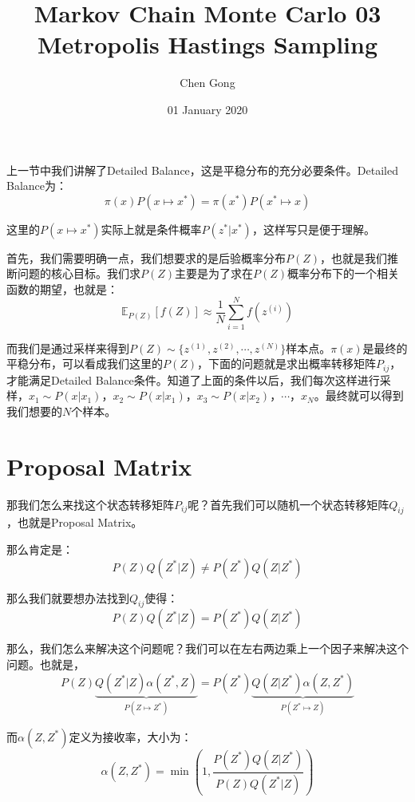 \documentclass[a4paper]{article}
\title{Markov Chain Monte Carlo 03 Metropolis Hastings Sampling}
\author{Chen Gong}
\date{01 January 2020}
\begin{document}
\maketitle
上一节中我们讲解了Detailed Balance，这是平稳分布的充分必要条件。Detailed Balance为：
\begin{equation}
    \pi(x)P(x\mapsto x^\ast) = \pi(x^\ast)P(x^\ast \mapsto x)
\end{equation}

这里的$P(x\mapsto x^\ast)$实际上就是条件概率$P(z^\ast|x^\ast)$，这样写只是便于理解。

首先，我们需要明确一点，我们想要求的是后验概率分布$P(Z)$，也就是我们推断问题的核心目标。我们求$P(Z)$主要是为了求在$P(Z)$概率分布下的一个相关函数的期望，也就是：
\begin{equation}
    \mathbb{E}_{P(Z)}[f(Z)] \approx \frac{1}{N} \sum_{i=1}^N f(z^{(i)})
\end{equation}

而我们是通过采样来得到$P(Z) \sim \{ z^{(1)},z^{(2)},\cdots, z^{(N)} \}$样本点。$\pi(x)$是最终的平稳分布，可以看成我们这里的$P(Z)$，下面的问题就是求出概率转移矩阵$P_{ij}$，才能满足Detailed Balance条件。知道了上面的条件以后，我们每次这样进行采样，$x_1\sim P(x|x_1)$，$x_2\sim P(x|x_1)$，$x_3\sim P(x|x_2)$，$\cdots$，$x_N$。最终就可以得到我们想要的$N$个样本。

\section{Proposal Matrix}
那我们怎么来找这个状态转移矩阵$P_{ij}$呢？首先我们可以随机一个状态转移矩阵$Q_{ij}$，也就是Proposal Matrix。

那么肯定是：
\begin{equation}
    P(Z)Q(Z^\ast|Z)  \neq P(Z^\ast)Q(Z|Z^\ast)
\end{equation}

那么我们就要想办法找到$Q_{ij}$使得：
\begin{equation}
    P(Z)Q(Z^\ast|Z)  = P(Z^\ast)Q(Z|Z^\ast)
\end{equation}

那么，我们怎么来解决这个问题呢？我们可以在左右两边乘上一个因子来解决这个问题。也就是，
\begin{equation}
    P(Z)\underbrace{Q(Z^\ast|Z)\alpha(Z^\ast,Z)}_{P(Z\mapsto Z^\ast)}  = P(Z^\ast)\underbrace{Q(Z|Z^\ast)\alpha(Z,Z^\ast)}_{P(Z^\ast\mapsto Z)}
\end{equation}

而$\alpha(Z,Z^\ast)$定义为接收率，大小为：
\begin{equation}
    \alpha(Z,Z^\ast) 
    = \min \left( 1, \frac{P(Z^\ast)Q(Z|Z^\ast)}{P(Z)Q(Z^\ast|Z)}  \right)
\end{equation}
\end{document}
